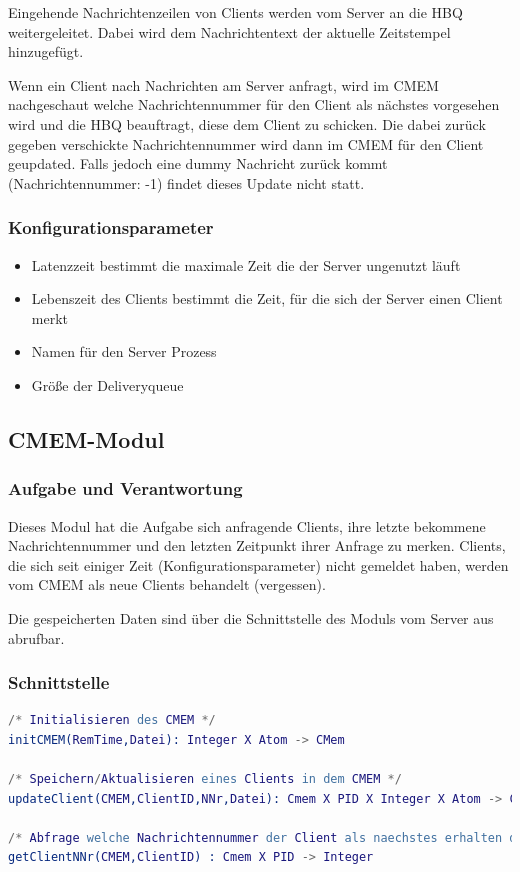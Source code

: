 \documentclass{article}
\begin{document}
Eingehende Nachrichtenzeilen von Clients werden vom Server an die HBQ weitergeleitet. Dabei wird dem Nachrichtentext der
aktuelle Zeitstempel hinzugefügt.

Wenn ein Client nach Nachrichten am Server anfragt, wird im CMEM nachgeschaut welche Nachrichtennummer für den Client
als nächstes vorgesehen wird und die HBQ beauftragt, diese dem Client zu schicken. Die dabei zurück gegeben verschickte
Nachrichtennummer wird dann im CMEM für den Client geupdated. Falls jedoch eine dummy Nachricht zurück kommt
(Nachrichtennummer: -1) findet dieses Update nicht statt.
			
\subsubsection{Konfigurationsparameter}
\begin{itemize}
    \item Latenzzeit bestimmt die maximale Zeit die der Server ungenutzt läuft
    \item Lebenszeit des Clients bestimmt die Zeit, für die sich der Server einen Client merkt
    \item Namen für den Server Prozess
    \item Größe der Deliveryqueue
\end{itemize}

\newpage

\subsection{CMEM-Modul}
\subsubsection{Aufgabe und Verantwortung}
Dieses Modul hat die Aufgabe sich anfragende Clients, ihre letzte bekommene Nachrichtennummer und den letzten Zeitpunkt ihrer Anfrage zu merken.
Clients, die sich seit einiger Zeit (Konfigurationsparameter) nicht gemeldet haben, werden vom CMEM als neue Clients behandelt (vergessen).

Die gespeicherten Daten sind über die Schnittstelle des Moduls vom Server aus abrufbar.

\subsubsection{Schnittstelle}
\begin{lstlisting}[language=erlang]
/* Initialisieren des CMEM */
initCMEM(RemTime,Datei): Integer X Atom -> CMem

/* Speichern/Aktualisieren eines Clients in dem CMEM */
updateClient(CMEM,ClientID,NNr,Datei): Cmem X PID X Integer X Atom -> CMem

/* Abfrage welche Nachrichtennummer der Client als naechstes erhalten darf */
getClientNNr(CMEM,ClientID) : Cmem X PID -> Integer
\end{lstlisting}
\end{document}
